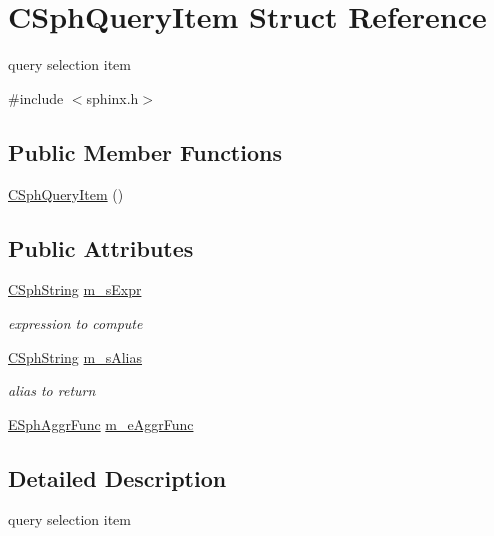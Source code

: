 \hypertarget{structCSphQueryItem}{\section{C\-Sph\-Query\-Item Struct Reference}
\label{structCSphQueryItem}
}


query selection item  




{\ttfamily \#include $<$sphinx.\-h$>$}

\subsection*{Public Member Functions}
\begin{DoxyCompactItemize}
\item 
\hyperlink{structCSphQueryItem_ae2686a4fc6f8e24cf6c781c20acca776}{C\-Sph\-Query\-Item} ()
\end{DoxyCompactItemize}
\subsection*{Public Attributes}
\begin{DoxyCompactItemize}
\item 
\hyperlink{structCSphString}{C\-Sph\-String} \hyperlink{structCSphQueryItem_adc54066ff9c6a6e20b16424b2aa1efb6}{m\-\_\-s\-Expr}
\begin{DoxyCompactList}\small\item\em expression to compute \end{DoxyCompactList}\item 
\hyperlink{structCSphString}{C\-Sph\-String} \hyperlink{structCSphQueryItem_a16732f20ba85f26cc59f3869778ffe14}{m\-\_\-s\-Alias}
\begin{DoxyCompactList}\small\item\em alias to return \end{DoxyCompactList}\item 
\hyperlink{sphinx_8h_a92532037c3ec9dad4a636e957fff58c9}{E\-Sph\-Aggr\-Func} \hyperlink{structCSphQueryItem_ab588e34ae1b9af981639b750375dde81}{m\-\_\-e\-Aggr\-Func}
\end{DoxyCompactItemize}


\subsection{Detailed Description}
query selection item 

